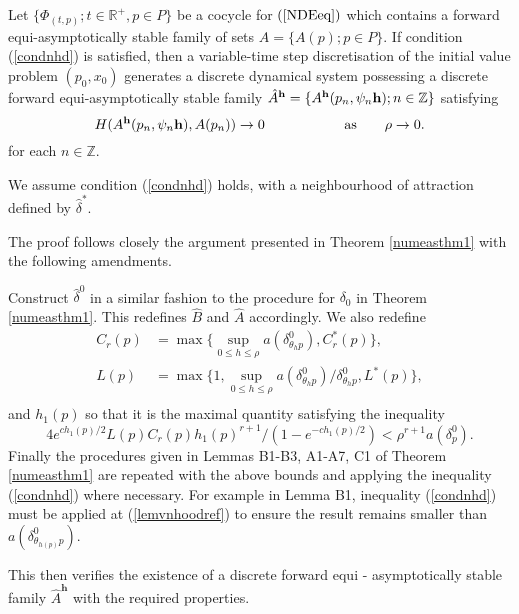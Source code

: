 \begin{therm}
\label{numeasthm2} Let $\{ \Phi_{(t, p)}; t \in \mathbb{R}^+, p
\in P \}$ be a cocycle for $(\ref{NDEeq})$ which contains a
forward equi-asymptotically stable family of sets $\hat{A} = \{
A(p) ; p \in P\}$. If condition (\ref{condnhd}) is satisfied, then
a variable-time step discretisation of the initial value problem $(p_0, x_0)$
generates a discrete dynamical system
possessing a discrete forward equi-asymptotically stable family
$\hat{A}^{{\bf h}} = \{ A^{{\bf h}}(p_n, \psi_n{\bf h}) ; n \in
\mathbb{Z} \}$ satisfying
\begin{equation}
 H( A^{{\bf h}}(p_n, \psi_n{\bf h}), A(p_n)) \to 0 \hspace{2cm} \text{as} \qquad
\rho \to  0.
\end{equation}
for each $n \in \mathbb{Z}$.
\end{therm}
\begin{prf}
We assume condition (\ref{condnhd}) holds, with a neighbourhood of
attraction defined by $\hat{\delta}^*$.

The proof follows closely the argument presented in Theorem \ref{numeasthm1}
with the following amendments.

Construct $\hat{\delta}^0$ in a similar fashion to the procedure for $\delta_0$
in Theorem \ref{numeasthm1}. This redefines $\hat{B}$ and $\hat{A}$ accordingly.
We also redefine
\begin{align*}
  C_r(p) &= \max \{ \sup_{0 \leq h \leq \rho} a(\delta^0_{\theta_hp}), C^*_r(p)
                 \}, \\
  L(p) &= \max \{ 1, \sup_{0 \leq h \leq \rho} a(\delta^0_{\theta_hp})
                  /\delta^0_{\theta_hp}, L^*(p) \}, \\
\end{align*}
and $h_1(p)$ so that it is the
maximal quantity satisfying the inequality
\[  4 e^{ch_1(p)/2}L(p)C_r(p)h_1(p)^{r+1}/(1-e^{-ch_1(p)/2}) <
      \rho^{r+1} a ( \delta^0_p ). \]
Finally the procedures given in Lemmas B1-B3, A1-A7, C1
of Theorem \ref{numeasthm1} are repeated with the above bounds and applying the
inequality (\ref{condnhd}) where necessary. For example in Lemma B1, inequality
(\ref{condnhd}) must be applied at (\ref{lemvnhoodref}) to ensure the result
remains smaller than $a(\delta^0_{\theta_{h(p)}p})$.

This then verifies the existence of a discrete forward equi - asymptotically
stable family $\hat{A}^{\textbf{h}}$ with the required properties.
\end{prf}

\endinput
